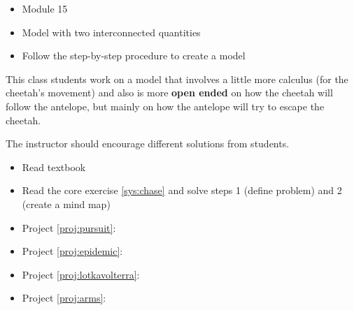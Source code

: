 \begin{lesson}

	\begin{itemize}
		\item Module 15
	\end{itemize}

	\begin{itemize}
		\item Model with two interconnected quantities
		\item Follow the step-by-step procedure to create a model
	\end{itemize}
	

This class students work on a model that involves a little more calculus (for the cheetah's movement) and also is more \textbf{open ended} on how the cheetah will follow the antelope, but mainly on how the antelope will try to escape the cheetah. 

The instructor should encourage different solutions from students. 



\begin{itemize}
	\item Read textbook
	\item Read the core exercise \ref{sys:chase} and solve steps 1 (define problem) and 2 (create a mind map)
\end{itemize}


\begin{itemize}
	\item Project \ref{proj:pursuit}: \pursuittitle
	\item Project \ref{proj:epidemic}: \epidemictitle
	\item Project \ref{proj:lotkavolterra}: \lotkavolterratitle
	\item Project \ref{proj:arms}: \armstitle
\end{itemize}



\end{lesson}


